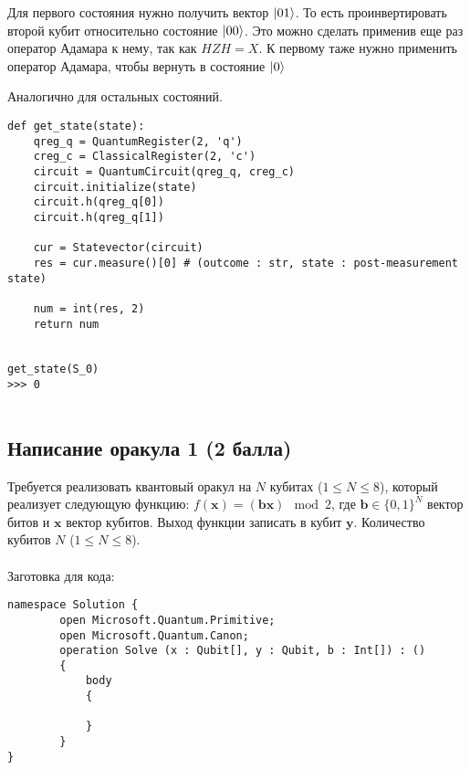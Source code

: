 \documentclass[a4paper]{article}
\begin{document}
Для первого состояния нужно получить вектор $\Ket{01}$. То есть проинвертировать второй кубит относительно состояние $ \Ket{00} $. 
Это можно сделать применив еще раз оператор Адамара к нему, так как $HZH = X$. К первому таже нужно применить оператор Адамара, чтобы вернуть в состояние $\Ket{0}$

Аналогично для остальных состояний.


\begin{verbatim}
def get_state(state):
    qreg_q = QuantumRegister(2, 'q')
    creg_c = ClassicalRegister(2, 'c')
    circuit = QuantumCircuit(qreg_q, creg_c)
    circuit.initialize(state)
    circuit.h(qreg_q[0])
    circuit.h(qreg_q[1])
    
    cur = Statevector(circuit)
    res = cur.measure()[0] # (outcome : str, state : post-measurement state) 
    
    num = int(res, 2)
    return num


get_state(S_0)
>>>	0
	
\end{verbatim}


\subsection{Написание оракула 1 (2 балла)}

Требуется реализовать квантовый оракул на $N$ кубитах ($1 \le N \le 8$), который реализует следующую функцию: $f(\pmb{x}) = (\pmb{b}\pmb{x}) \mod 2$, где  $\pmb{b} \in \{0,1\}^N$ вектор битов и  $\pmb{x}$ вектор кубитов. Выход функции записать в кубит $\pmb{y}$. Количество кубитов $N$ ($1 \le N \le 8$). 
\\\\
Заготовка для кода:
\begin{lstlisting}
namespace Solution {
        open Microsoft.Quantum.Primitive;
        open Microsoft.Quantum.Canon;
        operation Solve (x : Qubit[], y : Qubit, b : Int[]) : ()
        {
            body
            {

            }
        }
}
\end{lstlisting}
\end{document}
